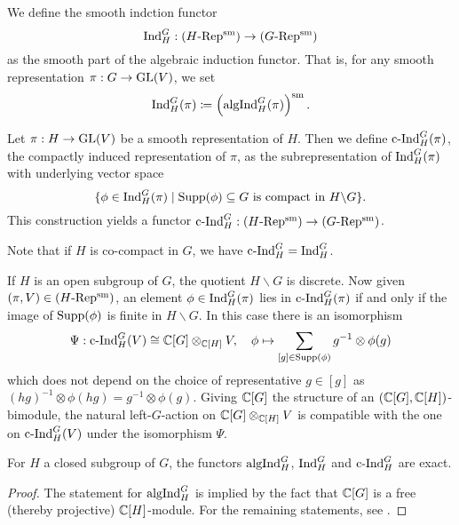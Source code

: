 \documentclass[../main.tex]{subfiles}
\begin{document}
\begin{defi}\label{def:SmoothInduction}
  We define the smooth indction functor 
  $$\mathrm{Ind}_H^G: {({H}\text-\allowbreak\mathrm{Rep^{\mathrm{sm}}})} \to {({G}\text-\allowbreak\mathrm{Rep^{\mathrm{sm}}})}$$ 
  as the smooth part of the algebraic induction functor. That is, for any smooth
  representation $\pi: G \to \operatorname{GL}(V)$, we set
  \begin{equation*}
    \mathrm{Ind}_H^G(\pi) \coloneqq \left(\mathrm{algInd}_H^G(\pi)\right)^{\mathrm{sm}}.
  \end{equation*}
  \end{defi}

\begin{defi}\label{def:CompactInduction}
  Let $\pi: H \to \operatorname{GL}(V)$ be a smooth representation
  of $H$. Then we define $\mathrm{c\text{-}Ind}_H^G(\pi)$, the compactly induced representation
  of $\pi$, as the subrepresentation of $\mathrm{Ind}_H^G(\pi)$ with underlying vector
  space
  \begin{equation*}
    \{\phi \in \mathrm{Ind}_H^G(\pi) \mid \operatorname{Supp}(\phi) \subseteq G \text{ is compact in }
    H\backslash G\}.
  \end{equation*}
  This construction yields a functor $\mathrm{c\text{-}Ind}_H^G: {({H}\text-\allowbreak\mathrm{Rep^{\mathrm{sm}}})} \to {({G}\text-\allowbreak\mathrm{Rep^{\mathrm{sm}}})}$. 
\end{defi}
Note that if $H$ is co-compact in $G$, we have $\mathrm{c\text{-}Ind}_H^G = \mathrm{Ind}_H^G$. 

\begin{rmk} 
  If $H$ is an open subgroup of $G$, the quotient $H \backslash G$ is 
  discrete. Now given $(\pi, V) \in {({H}\text-\allowbreak\mathrm{Rep^{\mathrm{sm}}})}$, an element $\phi \in \mathrm{Ind}_H^G(\pi)$
  lies in $\mathrm{c\text{-}Ind}_H^G(\pi)$ if and only if 
  the image of $\operatorname{Supp}(\phi)$ is finite in $H \backslash G$. 
  In this case there is an isomorphism
  \begin{equation}\label{eq:cIndTensorExpr}
    \Psi: \mathrm{c\text{-}Ind}_H^G(V) \cong \mathbb{C}[G] \otimes_{\mathbb{C}[H]} V, \quad \phi \mapsto \sum_{[g]
    \in \operatorname{Supp}(\phi)} g^{-1} \otimes \phi(g)
  \end{equation}
  which does not depend on the choice of representative $g \in [g]$ as 
  $(hg)^{-1} \otimes \phi(hg) = g^{-1} \otimes \phi(g)$. 
  Giving $\mathbb{C}[G]$ the structure of an $(\mathbb{C}[G], \mathbb{C}[H])$-bimodule, the natural
  left-$G$-action on $\mathbb{C}[G] \otimes_{\mathbb{C}[H]} V$ is compatible with the one 
  on $\mathrm{c\text{-}Ind}_H^G(V)$ under the isomorphism $\Psi$. 
\end{rmk}

\begin{prop}\label{prop:InducedRepresentationExact}
  For $H$ a closed subgroup of $G$, the functors $\mathrm{algInd}_H^G$, $\mathrm{Ind}_H^G$ and
  $\mathrm{c\text{-}Ind}_H^G$  are exact. 
  \begin{proof}
    The statement for $\mathrm{algInd}_H^G$ is implied by the fact that 
    $\mathbb{C}[G]$ is a free (thereby projective) $\mathbb{C}[H]$-module. For the remaining statements,
    see \cite[p. 18f]{bushnell2006local}.
  \end{proof}
\end{prop}
\end{document}
